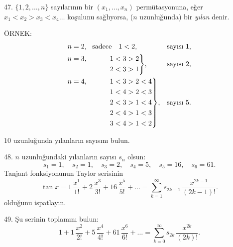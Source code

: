 \begin{problem}{47.}
$\{1,2,\ldots,n\}$ sayılarının bir $(x_1,\ldots,x_n)$ permütasyonuna, eğer $x_1<x_2>x_3<x_4\ldots$ koşulunu sağlıyorsa, ($n$ uzunluğunda) bir {\it yılan} denir.

	\begin{note}{ÖRNEK:}
		\begin{equation*}
			\begin{aligned}[t]
				&\begin{aligned}[t] n=2, \text{\ \ sadece \ \ } 1<2, \end{aligned} &&\text{sayısı }1, \\
				&\hskip-\nulldelimiterspace\mathord{\left.\begin{aligned} n=3, \hphantom{\text{\ \ only\ \ }} 1&<3>2 \\
				2&<3>1\end{aligned} \right\}}, && \text{sayısı }2, \\
				&\hskip-\nulldelimiterspace\mathord{\left.\begin{aligned} n=4, \hphantom{\text{\ \ only\ \ }} 1&<3>2<4 \\
				1&<4>2<3 \\
				2&<3>1<4 \\
				2&<4>1<3 \\
				3&<4>1<2\end{aligned} \right\}},
				&&\text{sayısı }5. \\
			\end{aligned}
		\end{equation*}
	\end{note}
	$10$ uzunluğunda yılanların sayısını bulun.
\end{problem}

\begin{problem}{48.}
	$n$ uzunluğundaki yılanların sayısı $s_n$ olsun:
	\begin{equation*}
		s_1=1, \quad s_2=1, \quad s_3=2, \quad s_4=5, \quad s_5=16, \quad s_6=61.
	\end{equation*}
	Tanjant fonksiyonunun Taylor serisinin
	\begin{equation*}
		\tan x=1\, \frac{x^1}{1!}+2\, \frac{x^3}{3!}+16\, \frac{x^5}{5!}+\dots=
		\textstyle\sum\limits_{k=1}^{\infty} s_{2k-1}\, \frac{x^{2k-1}}{(2k-1)!}.
	\end{equation*}
olduğunu ispatlayın.
\end{problem}

\begin{problem}{49.}
	Şu serinin toplamını bulun:
	\begin{equation*}
		1+1\, \frac{x^2}{2!}+5\, \frac{x^4}{4!}+61\, \frac{x^6}{6!}+\dots=
		\textstyle\sum\limits_{k=0}^{\infty} s_{2k}\,\frac{x^{2k}}{(2k)!}.
	\end{equation*}
\end{problem}


